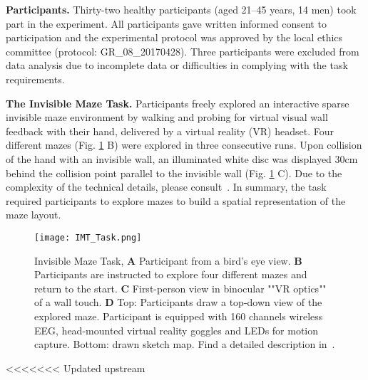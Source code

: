 
\indent \textbf{Participants.} Thirty-two healthy participants (aged 21--45 years, 14 men) took part in the
experiment. All participants gave written informed consent to participation and the experimental protocol was approved by the local ethics committee (protocol: GR\_08\_20170428). Three participants were excluded from data analysis due to incomplete data or difficulties in complying with the task requirements.

\indent \textbf{The Invisible Maze Task.} Participants freely explored an interactive sparse invisible maze environment by walking and probing for virtual visual wall feedback with their hand, delivered by a virtual reality (VR) headset. Four different mazes (Fig. \ref{imt_task} B) were explored in three consecutive runs. Upon collision of the hand with an invisible wall, an illuminated white disc was displayed 30cm behind the collision point parallel to the invisible wall (Fig. \ref{imt_task} C). Due to the complexity of the technical details, please consult~\cite{gehrke2018}. In summary, the task required participants to explore mazes to build a spatial representation of the maze layout.%

\begin{figure}[h]
\centering
\texttt{[image: IMT\_Task.png]}
\vspace{0pt}
\caption{Invisible Maze Task, \textbf{A} Participant from a bird’s eye view. \textbf{B} Participants are instructed to explore four different mazes and return to the start. \textbf{C} First-person view in binocular ""VR optics"" of a wall touch. \textbf{D} Top: Participants draw a top-down view of the explored maze. Participant is equipped with 160 channels wireless EEG, head-mounted virtual reality goggles and LEDs for motion capture. Bottom: drawn sketch map. Find a detailed description in~\cite{gehrke2018}.}
\label{imt_task}
\end{figure}

<<<<<<< Updated upstream
